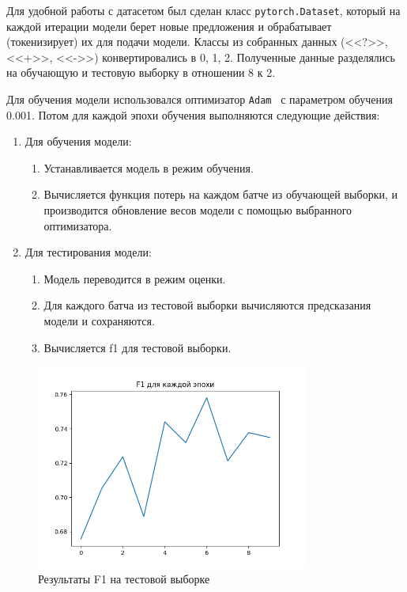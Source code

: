 \documentclass[PI, VKR]{HSEUniversity}
\begin{document}
Для удобной работы с датасетом был сделан класс \texttt{pytorch.Dataset}, который на каждой итерации модели берет новые предложения и обрабатывает (токенизирует) их для подачи модели. Классы из собранных данных ({}<<?>>{}, {}<<+>>{}, {}<<->>{}) конвертировались в 0, 1, 2. Полученные данные разделялись на обучающую и тестовую выборку в отношении 8 к 2.

Для обучения модели использовался оптимизатор \texttt{Adam}~\autocite{kingma_adam_2017} с параметром обучения 0.001. Потом для каждой эпохи обучения выполняются следующие действия:
\begin{enumerate}
\item Для обучения модели:
\begin{enumerate}
\item Устанавливается модель в режим обучения.
\item Вычисляется функция потерь на каждом батче из обучающей выборки, и производится обновление весов модели с помощью выбранного оптимизатора.
\end{enumerate}

\item Для тестирования модели:
\begin{enumerate}
\item Модель переводится в режим оценки.
\item Для каждого батча из тестовой выборки вычисляются предсказания модели и сохраняются.
\item Вычисляется f1 для тестовой выборки.
\end{enumerate}
\end{enumerate}

\begin{figure}[h!]
\centering
\includegraphics[width=0.8\textwidth]{img/test_f1.png}
\caption{\label{fig:test_f1}Результаты F1 на тестовой выборке}
\end{figure}
\end{document}
